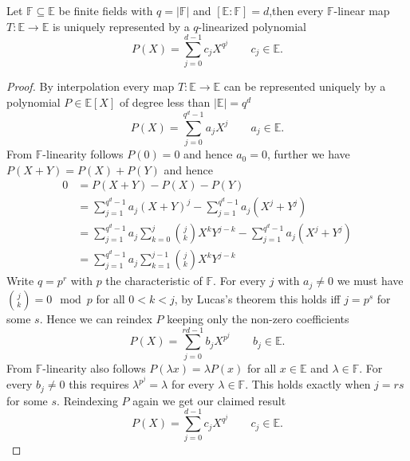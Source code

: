 \begin{theorem}
Let $\mathbb{F} \subseteq \mathbb{E}$ be finite fields with $q = |\mathbb{F}|$ and $[\mathbb{E}:\mathbb{F}] = d$,then every $\mathbb{F}$-linear map $T: \mathbb{E} \to \mathbb{E}$ is uniquely represented by a $q$-linearized polynomial
\[
P(X)=\sum_{j=0}^{d - 1} c_j X^{q^j} \qquad c_j\in\mathbb E \text{.}
\]
\end{theorem}
\begin{proof}
By interpolation every map $T: \mathbb{E} \to \mathbb{E}$ can be represented uniquely by a polynomial $P \in \mathbb{E}[X]$ of degree less than $|\mathbb{E}| = q^d$
\[
P(X)=\sum_{j=0}^{q^d - 1} a_j X^j \qquad a_j\in\mathbb E \text{.}
\]
From $\mathbb{F}$-linearity follows $P(0) = 0$ and hence $a_0 = 0$, further we have $P(X + Y) = P(X) + P(Y)$ and hence
\[
\begin{aligned}
0 &= P(X + Y) - P(X) - P(Y) \\
&= \sum_{j=1}^{q^d - 1} a_j (X + Y)^j - \sum_{j=1}^{q^d - 1} a_j (X^j + Y^j) \\
&= \sum_{j=1}^{q^d - 1} a_j \sum_{k=0}^{j} \binom{j}{k}X^k Y^{j-k} - \sum_{j=1}^{q^d - 1} a_j (X^j + Y^j)\\
&= \sum_{j=1}^{q^d - 1} a_j \sum_{k=1}^{j-1} \binom{j}{k}X^k Y^{j-k}
\end{aligned}
\]
Write $q=p^r$ with $p$ the characteristic of $\mathbb{F}$. For every $j$ with $a_j \neq 0$ we must have $\binom{j}{k} =0 \mod p$ for all $0<k<j$, by Lucas’s theorem this holds iff $j = p^s$ for some $s$. Hence we can reindex $P$ keeping only the non-zero coefficients
\[
P(X)=\sum_{j=0}^{rd - 1} b_j X^{p^j} \qquad b_j\in\mathbb E \text{.}
\]
From $\mathbb{F}$-linearity also follows $P(\lambda x) = \lambda P(x)$ for all $x \in \mathbb{E}$ and $\lambda \in \mathbb{F}$. For every $b_j \neq 0$ this requires $\lambda^{p^j} = \lambda$ for every $\lambda \in \mathbb{F}$. This holds exactly when $j = r s$ for some $s$. Reindexing $P$ again we get our claimed result
\[
P(X)=\sum_{j=0}^{d - 1} c_j X^{q^j} \qquad c_j\in\mathbb E \text{.}
\]
\end{proof}



